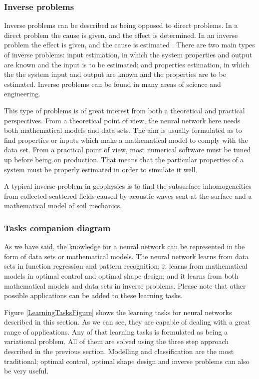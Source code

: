 \subsubsection{Inverse problems}

Inverse problems can be described as being opposed to direct
problems. In a direct problem the cause is given, and the effect is
determined. In an inverse problem the effect is given, and the cause
is estimated \cite{Kirsch1996} \cite{Sabatier2000} \cite{Ramm2005}.
There are two main types of inverse problems: input estimation, in
which the system properties and output are known and the input is to
be estimated; and properties estimation, in which the the system
input and output are known and the properties are to be estimated.
Inverse problems can be found in many areas of science and
engineering. 

This type of problems is of great interest from both a theoretical and practical perspectives. 
From a theoretical point of view, the neural network here needs both mathematical models and data sets. 
The aim is usually formulated as to find properties or inputs which make a mathematical model to comply with the data set. 
From a practical point of view, most numerical software must be tuned up before being on production. 
That means that the particular properties of a system must be properly estimated in order to simulate it well.

A typical inverse problem in geophysics is to find the 
subsurface inhomogeneities from collected scattered fields caused by
acoustic waves sent at the surface and a mathematical model of soil mechanics.  

\subsubsection{Tasks companion diagram}

As we have said, the knowledge for a neural network can be represented in the form of data sets or mathematical models. 
The neural network learns from data sets in function regression and pattern recognition; 
it learns from mathematical models in optimal control and optimal shape design; 
and it learns from both mathematical models and data sets in inverse problems. 
Please note that other possible applications can be added to these learning tasks. 

Figure \ref{LearningTasksFigure} shows the learning tasks for neural networks described in this section. 
As we can see, they are capable of dealing with a great range of applications. 
Any of that learning tasks is formulated as being a variational problem. 
All of them are solved using the three step approach described in the previous section. 
Modelling and classification are the most traditional; 
optimal control, optimal shape design and inverse problems can also be very useful. 

